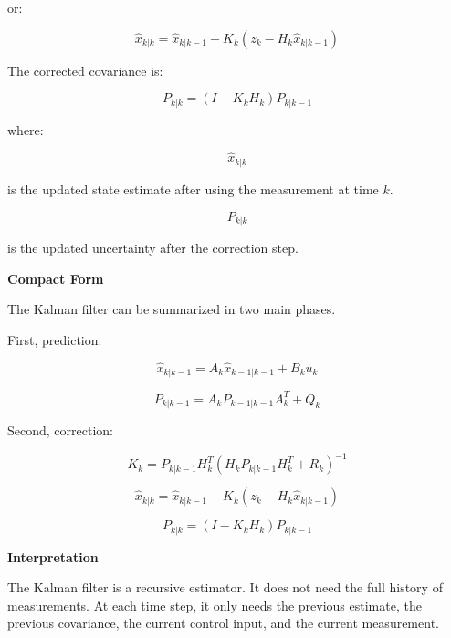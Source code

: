 \documentclass{book}
\providecommand{\ProjectDeepHeading}[2]{%
    \par\medskip\noindent\textbf{#2}\par\smallskip
}
\begin{document}
        or:
        
        \[
            \hat{x}_{k|k} =
            \hat{x}_{k|k-1} +
            K_k
            \left(
                z_k - H_k \hat{x}_{k|k-1}
            \right)
        \]
        
        The corrected covariance is:
        
        \[
            P_{k|k} =
            \left(
                I - K_k H_k
            \right)
            P_{k|k-1}
        \]
        
        where:
        
        \[
            \hat{x}_{k|k}
        \]
        
        is the updated state estimate after using the measurement at time \(k\).
        
        \[
            P_{k|k}
        \]
        
        is the updated uncertainty after the correction step.
    
    
    \ProjectDeepHeading{10}{Compact Form}
        
        The Kalman filter can be summarized in two main phases.
        
        First, prediction:
        
        \[
            \hat{x}_{k|k-1} = A_k \hat{x}_{k-1|k-1} + B_k u_k
        \]
        
        \[
            P_{k|k-1} = A_k P_{k-1|k-1} A_k^T + Q_k
        \]
        
        Second, correction:
        
        \[
            K_k =
            P_{k|k-1} H_k^T
            \left(
                H_k P_{k|k-1} H_k^T + R_k
            \right)^{-1}
        \]
        
        \[
            \hat{x}_{k|k} =
            \hat{x}_{k|k-1}
            +
            K_k
            \left(
                z_k - H_k \hat{x}_{k|k-1}
            \right)
        \]
        
        \[
            P_{k|k} =
            \left(
                I - K_k H_k
            \right)
            P_{k|k-1}
        \]
    
    
    \ProjectDeepHeading{10}{Interpretation}
        
        The Kalman filter is a recursive estimator.
        It does not need the full history of measurements.
        At each time step, it only needs the previous estimate, the previous covariance, the current control input, and the current measurement.
        
\end{document}
